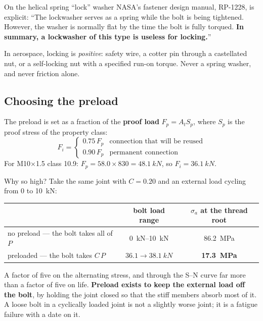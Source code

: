 \documentclass[11pt,a4paper]{article}
\begin{document}
\begin{aerobox}{On the helical spring ``lock'' washer}
NASA's fastener design manual, RP-1228, is explicit: ``The lockwasher serves as a spring while the
bolt is being tightened. However, the washer is normally flat by the time the bolt is fully torqued.
\textbf{In summary, a lockwasher of this type is useless for locking.}''

\medskip
In aerospace, locking is \emph{positive}: safety wire, a cotter pin through a castellated nut, or a
self-locking nut with a specified run-on torque. Never a spring washer, and never friction alone.
\end{aerobox}

\subsection{Choosing the preload}

The preload is set as a fraction of the \textbf{proof load} $F_p = A_t S_p$, where $S_p$ is the proof
stress of the property class:
\[
F_i = \begin{cases} 0.75\,F_p & \text{connection that will be reused}\\
                    0.90\,F_p & \text{permanent connection}\end{cases}
\]
For M10$\times$1.5 class 10.9: $F_p = 58.0\times830 = \SI{48.1}{kN}$, so $F_i = \SI{36.1}{kN}$.

\medskip
Why so high? Take the same joint with $C=0.20$ and an external load cycling from 0 to \SI{10}{kN}:

\begin{center}\small
\begin{tabular}{@{}lcc@{}}
\toprule
 & bolt load range & $\sigma_a$ at the thread root\\
\midrule
no preload --- the bolt takes all of $P$ & \SIrange{0}{10}{kN} & \SI{86.2}{MPa}\\
preloaded --- the bolt takes $C\,P$ & $36.1\to\SI{38.1}{kN}$ & \textbf{\SI{17.3}{MPa}}\\
\bottomrule
\end{tabular}
\end{center}

\medskip
A factor of five on the alternating stress, and through the S--N curve far more than a factor of five
on life. \textbf{Preload exists to keep the external load off the bolt}, by holding the joint closed
so that the stiff members absorb most of it. A loose bolt in a cyclically loaded joint is not a
slightly worse joint; it is a fatigue failure with a date on it.
\end{document}
